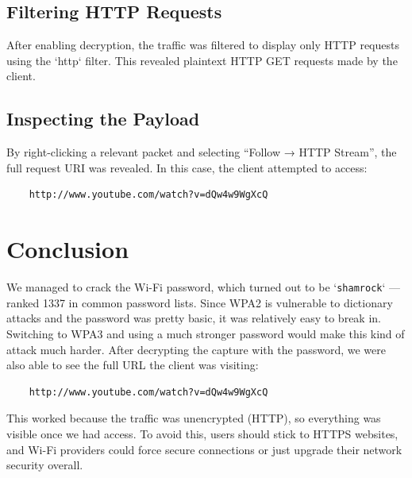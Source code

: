 \documentclass[a4paper, 11pt]{article}          %
\begin{document}
\subsection{Filtering HTTP Requests}
After enabling decryption, the traffic was filtered to display only HTTP requests using the `http` filter. This revealed plaintext HTTP GET requests made by the client.

\subsection{Inspecting the Payload}
By right-clicking a relevant packet and selecting “Follow → HTTP Stream”, the full request URI was revealed. In this case, the client attempted to access:
\begin{verbatim}
    http://www.youtube.com/watch?v=dQw4w9WgXcQ
\end{verbatim}

\section{Conclusion}
We managed to crack the Wi-Fi password, which turned out to be `\texttt{shamrock}` — ranked 1337 in common password lists. Since WPA2 is vulnerable to dictionary attacks and the password was pretty basic, it was relatively easy to break in. Switching to WPA3 and using a much stronger password would make this kind of attack much harder.
\newline
After decrypting the capture with the password, we were also able to see the full URL the client was visiting:
\begin{verbatim}
    http://www.youtube.com/watch?v=dQw4w9WgXcQ
\end{verbatim}
\newline
This worked because the traffic was unencrypted (HTTP), so everything was visible once we had access. To avoid this, users should stick to HTTPS websites, and Wi-Fi providers could force secure connections or just upgrade their network security overall.


\end{document}
